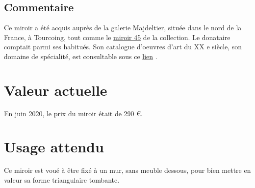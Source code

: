       \subsection* {Commentaire}
       
    
Ce miroir a été acquis auprès de la galerie Majdeltier, située dans le nord de la
                France, à Tourcoing, tout comme le 
    \href{miroir45.xml}{miroir
                    45}
   de la collection. Le donataire comptait parmi ses habitués. Son
                catalogue d'oeuvres d'art du XX
      {\up e}  siècle, son domaine de spécialité, est consultable
                sous ce  
    \href{https://www.proantic.com/galerie/majdeltier/}{lien}
  . 
    

      \section* {Valeur actuelle} En juin 2020, le prix du miroir était de 290 €.
      \section* {Usage attendu}  
    
Ce miroir est voué à être fixé à un mur, sans meuble dessous, pour bien mettre en valeur
            sa forme triangulaire tombante. 
    

    
  